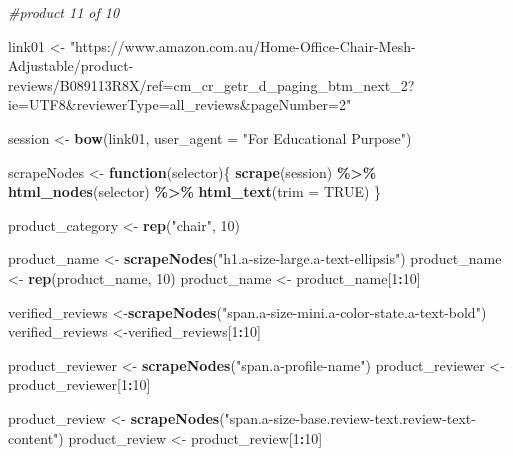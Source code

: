 \documentclass[
]{article}
\newenvironment{Shaded}{\begin{snugshade}}{\end{snugshade}}
\newcommand{\AttributeTok}[1]{\textcolor[rgb]{0.13,0.29,0.53}{#1}}
\newcommand{\CommentTok}[1]{\textcolor[rgb]{0.56,0.35,0.01}{\textit{#1}}}
\newcommand{\ConstantTok}[1]{\textcolor[rgb]{0.56,0.35,0.01}{#1}}
\newcommand{\ControlFlowTok}[1]{\textcolor[rgb]{0.13,0.29,0.53}{\textbf{#1}}}
\newcommand{\DecValTok}[1]{\textcolor[rgb]{0.00,0.00,0.81}{#1}}
\newcommand{\FunctionTok}[1]{\textcolor[rgb]{0.13,0.29,0.53}{\textbf{#1}}}
\newcommand{\NormalTok}[1]{#1}
\newcommand{\OtherTok}[1]{\textcolor[rgb]{0.56,0.35,0.01}{#1}}
\newcommand{\SpecialCharTok}[1]{\textcolor[rgb]{0.81,0.36,0.00}{\textbf{#1}}}
\newcommand{\StringTok}[1]{\textcolor[rgb]{0.31,0.60,0.02}{#1}}
\begin{document}
\begin{Shaded}
\begin{Highlighting}[]
\CommentTok{\#product 11 of 10}

\NormalTok{link01 }\OtherTok{\textless{}{-}} \StringTok{"https://www.amazon.com.au/Home{-}Office{-}Chair{-}Mesh{-}Adjustable/product{-}reviews/B089113R8X/ref=cm\_cr\_getr\_d\_paging\_btm\_next\_2?ie=UTF8\&reviewerType=all\_reviews\&pageNumber=2"}


\NormalTok{  session }\OtherTok{\textless{}{-}} \FunctionTok{bow}\NormalTok{(link01,}
               \AttributeTok{user\_agent =} \StringTok{"For Educational Purpose"}\NormalTok{)}

\NormalTok{  scrapeNodes }\OtherTok{\textless{}{-}} \ControlFlowTok{function}\NormalTok{(selector)\{}
    \FunctionTok{scrape}\NormalTok{(session) }\SpecialCharTok{\%\textgreater{}\%}
      \FunctionTok{html\_nodes}\NormalTok{(selector) }\SpecialCharTok{\%\textgreater{}\%}
      \FunctionTok{html\_text}\NormalTok{(}\AttributeTok{trim =} \ConstantTok{TRUE}\NormalTok{)}
\NormalTok{  \}}

\NormalTok{  product\_category }\OtherTok{\textless{}{-}} \FunctionTok{rep}\NormalTok{(}\StringTok{"chair"}\NormalTok{, }\DecValTok{10}\NormalTok{)}

\NormalTok{  product\_name }\OtherTok{\textless{}{-}} \FunctionTok{scrapeNodes}\NormalTok{(}\StringTok{"h1.a{-}size{-}large.a{-}text{-}ellipsis"}\NormalTok{)}
\NormalTok{  product\_name }\OtherTok{\textless{}{-}} \FunctionTok{rep}\NormalTok{(product\_name, }\DecValTok{10}\NormalTok{)}
\NormalTok{  product\_name }\OtherTok{\textless{}{-}}\NormalTok{ product\_name[}\DecValTok{1}\SpecialCharTok{:}\DecValTok{10}\NormalTok{]}
  
\NormalTok{  verified\_reviews }\OtherTok{\textless{}{-}}\FunctionTok{scrapeNodes}\NormalTok{(}\StringTok{"span.a{-}size{-}mini.a{-}color{-}state.a{-}text{-}bold"}\NormalTok{)}
\NormalTok{  verified\_reviews }\OtherTok{\textless{}{-}}\NormalTok{verified\_reviews[}\DecValTok{1}\SpecialCharTok{:}\DecValTok{10}\NormalTok{]}
  
\NormalTok{  product\_reviewer }\OtherTok{\textless{}{-}} \FunctionTok{scrapeNodes}\NormalTok{(}\StringTok{"span.a{-}profile{-}name"}\NormalTok{)}
\NormalTok{  product\_reviewer }\OtherTok{\textless{}{-}}\NormalTok{ product\_reviewer[}\DecValTok{1}\SpecialCharTok{:}\DecValTok{10}\NormalTok{]}
  
\NormalTok{  product\_review }\OtherTok{\textless{}{-}} \FunctionTok{scrapeNodes}\NormalTok{(}\StringTok{"span.a{-}size{-}base.review{-}text.review{-}text{-}content"}\NormalTok{)}
\NormalTok{  product\_review }\OtherTok{\textless{}{-}}\NormalTok{ product\_review[}\DecValTok{1}\SpecialCharTok{:}\DecValTok{10}\NormalTok{]}
  

\end{Highlighting}
\end{Shaded}
\end{document}
